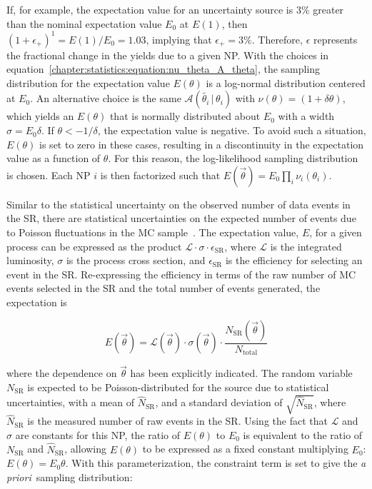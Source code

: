 \noindent
If, for example, the expectation value for an uncertainty source is
3\% greater than the nominal
expectation value $E_0$ at $E(1)$, then $(1+\epsilon_+)^1 = E(1)/E_0 =
1.03$, implying that $\epsilon_+ = 3\%$. Therefore, $\epsilon$
represents the fractional change in the yields due to a given NP. With
the choices in equation~\ref{chapter:statistics:equation:nu_theta_A_theta}, the
sampling distribution for the expectation value $E(\theta)$ is a
log-normal distribution centered at $E_0$. An alternative choice is the same
$\mathscr{A}(\tilde{\theta_i}\,|\,\theta_i)$ with $\nu(\theta) =
(1+\delta\theta)$, which yields an $E(\theta)$ that is normally
distributed about $E_0$ with a width $\sigma = E_0\delta$. If $\theta
< -1/\delta$, the expectation value is negative. To avoid such a
situation, $E(\theta)$ is set to zero in these cases, resulting in a
discontinuity in the expectation value as a function of
$\theta$. For this reason, the log-likelihood sampling distribution is
chosen. Each NP $i$ is then factorized such that $E(\vec{\theta}) =
E_0\prod_i \nu_i(\theta_i)$.

Similar to the statistical uncertainty on the observed number of
data events in the SR, there are statistical uncertainties on the
expected number of events
due to Poisson fluctuations in the MC sample~\cite{bib:Barlow:1993dm}. The expectation value,
$E$, for a given process can be expressed as the product
$\mathscr{L}\cdot \sigma \cdot \epsilon_{\textrm{SR}}$, where
$\mathscr{L}$ is the integrated luminosity, $\sigma$ is the process
cross section, and $\epsilon_{\textrm{SR}}$ is the efficiency for
selecting an event in the SR. Re-expressing the efficiency in terms of
the raw number of MC events selected in the SR and the total number of
events generated, the expectation is

\begin{equation}
E(\vec{\theta}) = \mathscr{L}(\vec{\theta})\cdot \sigma(\vec{\theta}) \cdot \frac{N_{\textrm{SR}}(\vec{\theta})}{N_{\textrm{total}}}
\label{chapter:statistics:figure:expect_factors}
\end{equation}

\noindent
where the dependence on $\vec{\theta}$ has been explicitly
indicated. The random variable $N_{\textrm{SR}}$ is expected to be
Poisson-distributed for the source due to statistical uncertainties,
with a mean of $\hat{N}_{\textrm{SR}}$, and a standard deviation of
$\sqrt{\hat{N}_{\textrm{SR}}}$, where $\hat{N}_{\textrm{SR}}$ is the
measured number of raw events in the SR. Using the fact
that $\mathscr{L}$ and $\sigma$ are constants for this NP,
the ratio of $E(\theta)$ to $E_0$ is equivalent to the ratio of
$N_{\textrm{SR}}$ and $\hat{N}_{\textrm{SR}}$, allowing $E(\theta)$ to
be expressed as a fixed constant multiplying $E_0$:
$E(\theta)= E_0\theta$. With this parameterization, the constraint term
is set to give the {\it a priori}~sampling distribution:

